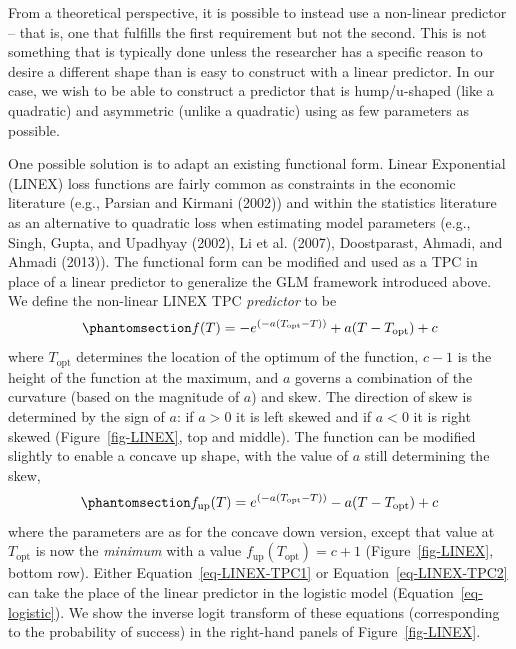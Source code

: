 \documentclass[
]{article}
\begin{document}
From a theoretical perspective, it is possible to instead use a
non-linear predictor -- that is, one that fulfills the first requirement
but not the second. This is not something that is typically done unless
the researcher has a specific reason to desire a different shape than is
easy to construct with a linear predictor. In our case, we wish to be
able to construct a predictor that is hump/u-shaped (like a quadratic)
and asymmetric (unlike a quadratic) using as few parameters as possible.

One possible solution is to adapt an existing functional form. Linear
Exponential (LINEX) loss functions are fairly common as constraints in
the economic literature (e.g., Parsian and Kirmani (2002)) and within
the statistics literature as an alternative to quadratic loss when
estimating model parameters (e.g., Singh, Gupta, and Upadhyay (2002), Li
et al. (2007), Doostparast, Ahmadi, and Ahmadi (2013)). The functional
form can be modified and used as a TPC in place of a linear predictor to
generalize the GLM framework introduced above. We define the non-linear
LINEX TPC \emph{predictor} to be
\begin{equation}\phantomsection\label{eq-LINEX-TPC1}{
f(T) = - e^{(-a( T_{\mathrm{opt}} - T ) )} + a ( T - T_{\mathrm{opt}}) + c 
}\end{equation} where \(T_{\mathrm{opt}}\) determines the location of
the optimum of the function, \(c - 1\) is the height of the function at
the maximum, and \(a\) governs a combination of the curvature (based on
the magnitude of \(a\)) and skew. The direction of skew is determined by
the sign of \(a\): if \(a>0\) it is left skewed and if \(a<0\) it is
right skewed (Figure~\ref{fig-LINEX}, top and middle). The function can
be modified slightly to enable a concave up shape, with the value of
\(a\) still determining the skew,
\begin{equation}\phantomsection\label{eq-LINEX-TPC2}{
f_{\mathrm{up}}(T) = e^{(-a( T_{\mathrm{opt}} - T ) )} - a ( T - T_{\mathrm{opt}}) + c  
}\end{equation} where the parameters are as for the concave down
version, except that value at \(T_{\mathrm{opt}}\) is now the
\emph{minimum} with a value \(f_{\mathrm{up}}(T_{\mathrm{opt}}) = c+1\)
(Figure~\ref{fig-LINEX}, bottom row). Either
Equation~\ref{eq-LINEX-TPC1} or Equation~\ref{eq-LINEX-TPC2} can take
the place of the linear predictor in the logistic model
(Equation~\ref{eq-logistic}). We show the inverse logit transform of
these equations (corresponding to the probability of success) in the
right-hand panels of Figure~\ref{fig-LINEX}.
\end{document}
